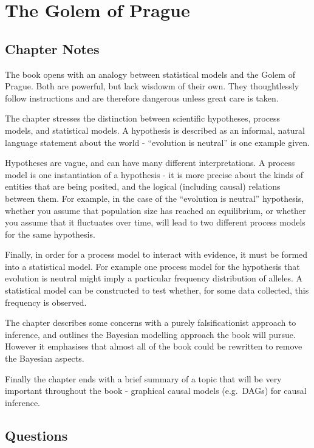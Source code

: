 \documentclass[
]{book}
\begin{document}
\hypertarget{prague}{%
\chapter{The Golem of Prague}\label{prague}}

\hypertarget{chapter-notes}{%
\section{Chapter Notes}\label{chapter-notes}}

The book opens with an analogy between statistical models and the Golem of Prague. Both are powerful, but lack wisdowm of their own. They thoughtlessly follow instructions and are therefore dangerous unless great care is taken.

The chapter stresses the distinction between scientific hypotheses, process models, and statistical models. A hypothesis is described as an informal, natural language statement about the world - ``evolution is neutral'' is one example given.

Hypotheses are vague, and can have many different interpretations. A process model is one instantiation of a hypothesis - it is more precise about the kinds of entities that are being posited, and the logical (including causal) relations between them. For example, in the case of the ``evolution is neutral'' hypothesis, whether you assume that population size has reached an equilibrium, or whether you assume that it fluctuates over time, will lead to two different process models for the same hypothesis.

Finally, in order for a process model to interact with evidence, it must be formed into a statistical model. For example one process model for the hypothesis that evolution is neutral might imply a particular frequency distribution of alleles. A statistical model can be constructed to test whether, for some data collected, this frequency is observed.

The chapter describes some concerns with a purely falsificationist approach to inference, and outlines the Bayesian modelling approach the book will pursue. However it emphasises that almost all of the book could be rewritten to remove the Bayesian aspects.

Finally the chapter ends with a brief summary of a topic that will be very important throughout the book - graphical causal models (e.g.~DAGs) for causal inference.

\hypertarget{questions}{%
\section{Questions}\label{questions}}
\end{document}
